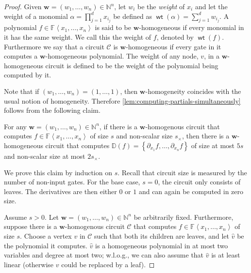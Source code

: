 \documentclass[10pt,a4paper]{article}
\def\Natural{\mathbb{N}}
\def\Field{\mathbb{F}}
\let\N\Natural
\let\F\Field
\def\set#1{\left\{ #1 \right\}}
\def\inangle#1{\left\langle #1 \right\rangle}
\def\vecw{\mathbf{w}}
\newcommand{\ckt}{\textbf{$\mathcal{C}$}}
\newcommand{\wt}{\operatorname{\mathsf{wt}}}
\begin{document}
\begin{proof}
  Given $\vecw = (w_1, \ldots, w_n) \in \N^n$, let $w_i$ be the \emph{weight} of $x_i$ and let the weight of a monomial $\alpha= \prod_{j=1}^{d} x_{i_j}$ be defined as $\wt(\alpha) = \sum_{j=1}^{d} w_{i_j}$.
  A polynomial $f \in \F\inangle{x_1, \ldots, x_n}$ is said to be $\vecw$-homogeneous if every monomial in it has the same weight.  We call this the weight of $f$, denoted by $\wt(f)$.
  Furthermore we say that a circuit $\ckt$ is $\vecw$-homogeneous if every gate in it computes a $\vecw$-homogeneous polynomial.
  The weight of any node, $v$, in a $\vecw$-homogeneous circuit is defined to be the weight of the polynomial being computed by it.

  Note that if $(w_1, \ldots, w_n) = (1, \ldots, 1)$, then  $\vecw$-homogeneity coincides with the usual notion of homogeneity. %
  Therefore \autoref{lem:computing-partials-simultaneously} follows from the following claim.
  
  \begin{claim}
    For any $\vecw = (w_1, \ldots, w_n) \in \N^n$, if there is a $\vecw$-homogenous circuit that computes $f \in \F\inangle{x_1, \ldots, x_n}$ of size $s$ and non-scalar size $s_\times$, then there is a $\vecw$-homogeneous  circuit that computes $\mathbb{D}(f) = \set{\partial_{ x_1}f, \ldots, \partial_{ x_n}f}$ of size at most $5s$ and non-scalar size at most $2s_\times$.
  \end{claim}

  We prove this claim by induction on $s$. Recall that circuit size is measured by the number of non-input gates. 
  For the base case, $s=0$, the circuit only consists of leaves. The derivatives are then either $0$ or $1$ and can again be computed in zero size.  
  
  Assume $s > 0$.
  Let $\vecw = (w_1, \ldots, w_n) \in \N^n$ be arbitrarily fixed.
  Furthermore, suppose there is a $\vecw$-homogenous  circuit $\ckt$ that computes $f \in \F\inangle{x_1, \ldots, x_n}$ of size $s$.
  Choose a vertex $v$ in $\ckt$ such that both its children are leaves, and let $\widehat {v}$ be the polynomial it computes.  
  $\widehat {v}$ is a homogeneous polynomial in at most two variables and degree at most two;  w.l.o.g., we can also assume that $\widehat {v}$ is at least linear (otherwise $v$ could be replaced by a leaf).  
  

\end{proof}
\end{document}
